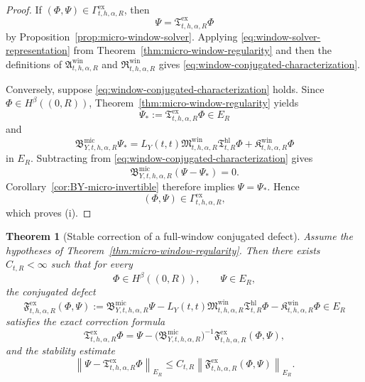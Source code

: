 \documentclass[11pt,a4paper]{amsart}
\theoremstyle{plain}
\newtheorem{theorem}{Theorem}[section]
\theoremstyle{definition}
\theoremstyle{remark}
\begin{document}
\begin{proof}
If \((\Phi,\Psi)\in \Gamma_{t,h,\alpha,R}^{\mathrm{ex}}\), then
\[
\Psi=\mathfrak T_{t,h,\alpha,R}^{\mathrm{ex}}\Phi
\]
by Proposition~\ref{prop:micro-window-solver}. Applying
\eqref{eq:window-solver-representation} from Theorem~\ref{thm:micro-window-regularity} and then the
definitions of \(\mathfrak A_{t,h,\alpha,R}^{\mathrm{win}}\) and
\(\mathfrak R_{t,h,\alpha,R}^{\mathrm{win}}\) gives
\eqref{eq:window-conjugated-characterization}.

Conversely, suppose \eqref{eq:window-conjugated-characterization} holds. Since
\(\Phi\in H^\beta((0,R))\), Theorem~\ref{thm:micro-window-regularity} yields
\[
\Psi_*:=\mathfrak T_{t,h,\alpha,R}^{\mathrm{ex}}\Phi\in E_R
\]
and
\[
\mathfrak B_{Y,t,h,\alpha,R}^{\mathrm{mic}}\Psi_*
=
L_Y(t,t)\mathfrak M_{t,h,\alpha,R}^{\mathrm{win}}
\mathfrak T_{t,R}^{\mathrm{hl}}\Phi
+
\mathfrak K_{t,h,\alpha,R}^{\mathrm{win}}\Phi
\]
in \(E_R\). Subtracting from \eqref{eq:window-conjugated-characterization} gives
\[
\mathfrak B_{Y,t,h,\alpha,R}^{\mathrm{mic}}(\Psi-\Psi_*)=0.
\]
Corollary~\ref{cor:BY-micro-invertible} therefore implies \(\Psi=\Psi_*\). Hence
\[
(\Phi,\Psi)\in\Gamma_{t,h,\alpha,R}^{\mathrm{ex}},
\]
which proves (i).
\end{proof}

\begin{theorem}[Stable correction of a full-window conjugated defect]
\label{thm:micro-window-correction}
Assume the hypotheses of Theorem~\ref{thm:micro-window-regularity}. Then there exists
\(C_{t,R}<\infty\) such that for every
\[
\Phi\in H^\beta((0,R)),
\qquad
\Psi\in E_R,
\]
the conjugated defect
\begin{equation}\label{eq:window-defect}
\mathfrak F_{t,h,\alpha,R}^{\mathrm{ex}}(\Phi,\Psi)
:=
\mathfrak B_{Y,t,h,\alpha,R}^{\mathrm{mic}}\Psi
-
L_Y(t,t)\mathfrak M_{t,h,\alpha,R}^{\mathrm{win}}
\mathfrak T_{t,R}^{\mathrm{hl}}\Phi
-
\mathfrak K_{t,h,\alpha,R}^{\mathrm{win}}\Phi
\in E_R
\end{equation}
satisfies the exact correction formula
\begin{equation}\label{eq:window-correction-formula}
\mathfrak T_{t,h,\alpha,R}^{\mathrm{ex}}\Phi
=
\Psi
-
\bigl(
\mathfrak B_{Y,t,h,\alpha,R}^{\mathrm{mic}}
\bigr)^{-1}
\mathfrak F_{t,h,\alpha,R}^{\mathrm{ex}}(\Phi,\Psi),
\end{equation}
and the stability estimate
\begin{equation}\label{eq:window-correction-bound}
\left\|
\Psi-\mathfrak T_{t,h,\alpha,R}^{\mathrm{ex}}\Phi
\right\|_{E_R}
\le
C_{t,R}
\left\|
\mathfrak F_{t,h,\alpha,R}^{\mathrm{ex}}(\Phi,\Psi)
\right\|_{E_R}.
\end{equation}
\end{theorem}
\end{document}
